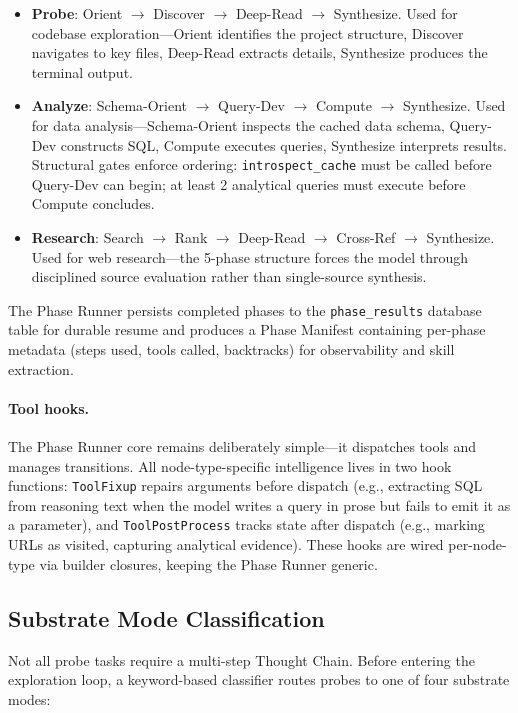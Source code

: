 \documentclass{article}
\begin{document}
\begin{itemize}[leftmargin=*]
\item \textbf{Probe}: Orient $\to$ Discover $\to$ Deep-Read $\to$ Synthesize.
Used for codebase exploration---Orient identifies the project structure, Discover navigates to key files, Deep-Read extracts details, Synthesize produces the terminal output.
\item \textbf{Analyze}: Schema-Orient $\to$ Query-Dev $\to$ Compute $\to$ Synthesize.
Used for data analysis---Schema-Orient inspects the cached data schema, Query-Dev constructs SQL, Compute executes queries, Synthesize interprets results.
Structural gates enforce ordering: \texttt{introspect\_cache} must be called before Query-Dev can begin; at least 2 analytical queries must execute before Compute concludes.
\item \textbf{Research}: Search $\to$ Rank $\to$ Deep-Read $\to$ Cross-Ref $\to$ Synthesize.
Used for web research---the 5-phase structure forces the model through disciplined source evaluation rather than single-source synthesis.
\end{itemize}

The Phase Runner persists completed phases to the \texttt{phase\_results} database table for durable resume and produces a Phase Manifest containing per-phase metadata (steps used, tools called, backtracks) for observability and skill extraction.

\paragraph{Tool hooks.}
The Phase Runner core remains deliberately simple---it dispatches tools and manages transitions.
All node-type-specific intelligence lives in two hook functions:
\texttt{ToolFixup} repairs arguments before dispatch (e.g., extracting SQL from reasoning text when the model writes a query in prose but fails to emit it as a parameter), and
\texttt{ToolPostProcess} tracks state after dispatch (e.g., marking URLs as visited, capturing analytical evidence).
These hooks are wired per-node-type via builder closures, keeping the Phase Runner generic.

\subsection{Substrate Mode Classification}
\label{sec:substrate_mode}

Not all probe tasks require a multi-step Thought Chain.
Before entering the exploration loop, a keyword-based classifier routes probes to one of four substrate modes:
\end{document}
